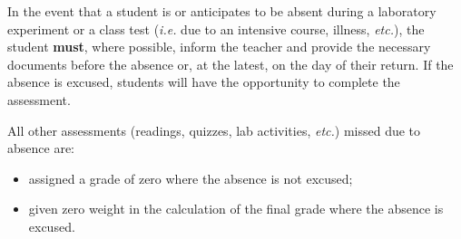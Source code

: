 \entry{\mbox{ }}
{In the event that a student is or anticipates to be absent during a laboratory experiment or a class test (\textit{i.e.} due to an intensive course, illness, \textit{etc.}), the student \textbf{must}, where possible, inform the teacher and provide the necessary documents before the absence or, at the latest, on the day of their return.  If the absence is excused, students will have the opportunity to complete the assessment.
\smallskip

All other assessments (readings, quizzes, lab activities, \textit{etc.}) missed due to absence are:
\begin{itemize}
	\item assigned a grade of zero where the absence is not excused;
	\item given zero weight in the calculation of the final grade where the absence is excused.
\end{itemize}
}
